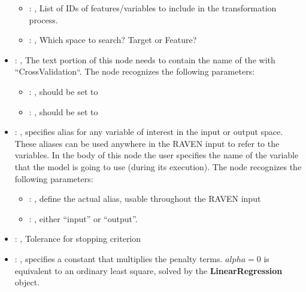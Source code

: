 \begin{itemize}
\begin{itemize}
        \item {}: , 
          List of IDs of features/variables to include in the transformation process.

        \item {}: , 
          Which space to search? Target or Feature?
      \end{itemize}

    \item {}: , 
      The text portion of this node needs to contain the name of the  with
               ``CrossValidation``.
      The  node recognizes the following parameters:
        \begin{itemize}
          \item {}: , 
            should be set to 
          \item {}: , 
            should be set to 
      \end{itemize}

    \item {}: , 
      specifies alias for         any variable of interest in the input or output space. These
      aliases can be used anywhere in the RAVEN input to         refer to the variables. In the body
      of this node the user specifies the name of the variable that the model is going to use
      (during its execution).
      The  node recognizes the following parameters:
        \begin{itemize}
          \item {}: , 
            define the actual alias, usable throughout the RAVEN input
          \item {}: , 
            either ``input'' or ``output''.
      \end{itemize}

    \item {}: , 
      Tolerance for stopping criterion

    \item {}: , 
      specifies a constant                                                  that multiplies the
      penalty terms.                                                  $alpha = 0$ is equivalent to
      an ordinary least square, solved by the
      \textbf{LinearRegression} object.


\end{itemize}
